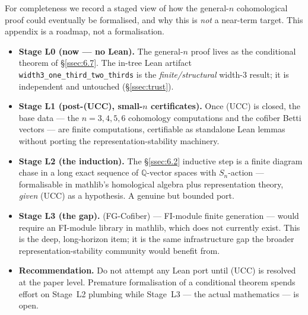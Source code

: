 \documentclass[11pt,reqno]{amsart}
\theoremstyle{plain}
\theoremstyle{definition}
\newcommand{\Q}{\mathbb{Q}}
\newcommand{\UCC}{\textup{(UCC)}}
\newcommand{\FGC}{\textup{(FG-Cofiber)}}
\begin{document}
For completeness we record a staged view of how the general-$n$
cohomological proof could eventually be formalised, and why this is
\emph{not} a near-term target. This appendix is a roadmap, not a
formalisation.

\begin{itemize}[leftmargin=1.6em]
  \item \textbf{Stage L0 (now --- no Lean).} The general-$n$ proof
        lives as the conditional theorem of \S\ref{ssec:6.7}. The
        in-tree Lean artifact \texttt{width3\_one\_third\_two\_thirds}
        is the \emph{finite/structural} width-3 result; it is
        independent and untouched (\S\ref{ssec:trust}).
  \item \textbf{Stage L1 (post-\UCC, small-$n$ certificates).} Once
        \UCC{} is closed, the base data --- the $n=3,4,5,6$ cohomology
        computations and the cofiber Betti vectors --- are
        finite computations, certifiable as standalone Lean lemmas
        without porting the representation-stability machinery.
  \item \textbf{Stage L2 (the induction).} The \S\ref{ssec:6.2}
        inductive step is a finite diagram chase in a long exact
        sequence of $\Q$-vector spaces with $S_n$-action --- formalisable
        in mathlib's homological algebra plus representation theory,
        \emph{given} \UCC{} as a hypothesis. A genuine but bounded port.
  \item \textbf{Stage L3 (the gap).} \FGC{} --- FI-module finite
        generation --- would require an FI-module library in mathlib,
        which does not currently exist. This is the deep, long-horizon
        item; it is the same infrastructure gap the broader
        representation-stability community would benefit from.
  \item \textbf{Recommendation.} Do not attempt any Lean port until
        \UCC{} is resolved at the paper level. Premature formalisation
        of a conditional theorem spends effort on Stage~L2 plumbing
        while Stage~L3 --- the actual mathematics --- is open.
\end{itemize}
\end{document}
